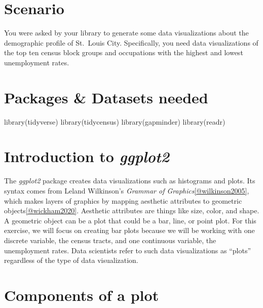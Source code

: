 \documentclass[
  krantz2]{krantz}
\makeatletter
\newenvironment{Shaded}{\begin{snugshade}}{\end{snugshade}}
\newcommand{\FunctionTok}[1]{\textcolor[rgb]{0,0,0}{#1}}
\newcommand{\NormalTok}[1]{#1}
\newenvironment{kframe}{%
\medskip{}
\setlength{\fboxsep}{.8em}
 \def\at@end@of@kframe{}%
 \ifinner\ifhmode%
  \def\at@end@of@kframe{\end{minipage}}%
  \begin{minipage}{\columnwidth}%
 \fi\fi%
 \def\FrameCommand##1{\hskip\@totalleftmargin \hskip-\fboxsep
 \colorbox{shadecolor}{##1}\hskip-\fboxsep
     \hskip-\linewidth \hskip-\@totalleftmargin \hskip\columnwidth}%
 \MakeFramed {\advance\hsize-\width
   \@totalleftmargin\z@ \linewidth\hsize
   \@setminipage}}%
 {\par\unskip\endMakeFramed%
 \at@end@of@kframe}
\renewenvironment{Shaded}{\begin{kframe}}{\end{kframe}}
\makeatother
\begin{document}
\hypertarget{ggplot2-scenario}{%
\section{Scenario}\label{ggplot2-scenario}}

You were asked by your library to generate some data visualizations about the demographic profile of St.~Louis City. Specifically, you need data visualizations of the top ten census block groups and occupations with the highest and lowest unemployment rates.

\hypertarget{ggplot-pkgs}{%
\section{Packages \& Datasets needed}\label{ggplot-pkgs}}

\begin{Shaded}
\begin{Highlighting}[]
\FunctionTok{library}\NormalTok{(tidyverse)}
\FunctionTok{library}\NormalTok{(tidycensus)}
\FunctionTok{library}\NormalTok{(gapminder)}
\FunctionTok{library}\NormalTok{(readr)}
\end{Highlighting}
\end{Shaded}

\hypertarget{ggplot2-intro}{%
\section{\texorpdfstring{Introduction to \emph{ggplot2}}{Introduction to ggplot2}}\label{ggplot2-intro}}

The \emph{ggplot2} package creates data visualizations such as histograms and plots. Its syntax comes from Leland Wilkinson's \emph{Grammar of Graphics}\ref{@wilkinson2005}, which makes layers of graphics by mapping aesthetic attributes to geometric objects\ref{@wickham2020}. Aesthetic attributes are things like size, color, and shape. A geometric object can be a plot that could be a bar, line, or point plot. For this exercise, we will focus on creating bar plots because we will be working with one discrete variable, the census tracts, and one continuous variable, the unemployment rates. Data scientists refer to such data visualizations as ``plots'' regardless of the type of data visualization.

\hypertarget{plot-components}{%
\section{Components of a plot}\label{plot-components}}
\end{document}

